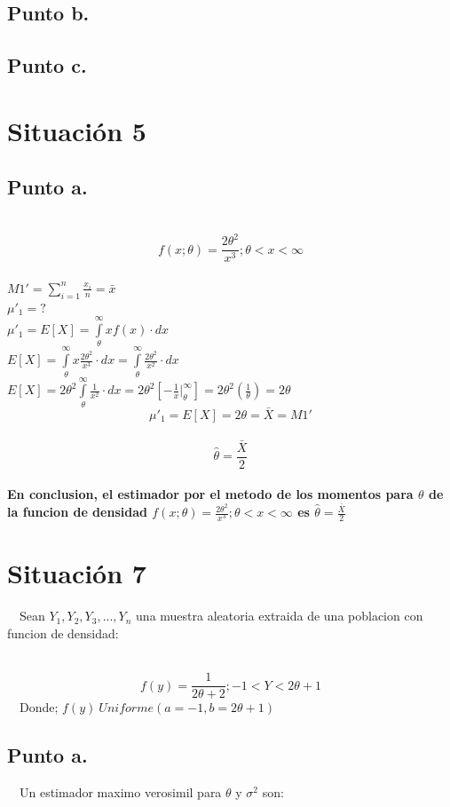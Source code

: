 \documentclass[letterpaper,12pt,onecolumn,titlepage]{article}
\begin{document}
\subsection{Punto b.}
\subsection{Punto c.}

\pagebreak\section{Situaci\'{o}n 5}
\subsection{Punto a.}
~\\ $$f(x;\theta) = \frac{2\theta^2}{x^3} ; \theta<x<\infty $$
~\\ $M1'=\sum_{i=1}^{n}\frac{x_{i}}{n}=\bar{x}$
~\\ $\mu'_1 =?$
~\\ $\mu'_1=E[X]= \int \limits_{\theta}^{\infty} x f(x) \cdot dx$
~\\ $E[X]=\int \limits_{\theta}^{\infty} x \frac{2\theta^2}{x^3}\cdot dx=\int \limits_{\theta}^{\infty}\frac{2\theta^2}{x^2}\cdot dx$
~\\ $E[X]=2\theta^2 \int \limits_{\theta}^{\infty}\frac{1}{x^2}\cdot dx= 2\theta^2[-\frac{1}{x}|_{\theta}^{\infty}]=2\theta^2(\frac{1}{\theta})=2\theta$
~\\ $$\mu'_1=E[X]=2\theta=\bar{X}=M1'$$
~\ $$\hat{\theta}=\frac{\bar{X}}{2}$$
~\\ \textbf{En conclusion, el estimador por el metodo de los momentos para $\theta$ de la funcion de densidad $f(x;\theta) = \frac{2\theta^2}{x^3} ; \theta<x<\infty $ es $\hat{\theta}=\frac{\bar{X}}{2}$}


\pagebreak\section{Situaci\'{o}n 7}
~\ Sean $Y_{1}, Y_{2}, Y_{3},...,Y_{n}$ una muestra aleatoria extraida de una poblacion con funcion de densidad:

~\ $$f({y})= \frac{1}{2\theta +2}  ;  -1<Y<2\theta+1$$
~\ Donde; $f({y}) ~ Uniforme(a=-1,b=2\theta+1)$

\subsection{Punto a.}
~\ Un estimador maximo verosimil para $\theta$ y $\sigma^{2}$ son:
\end{document}
